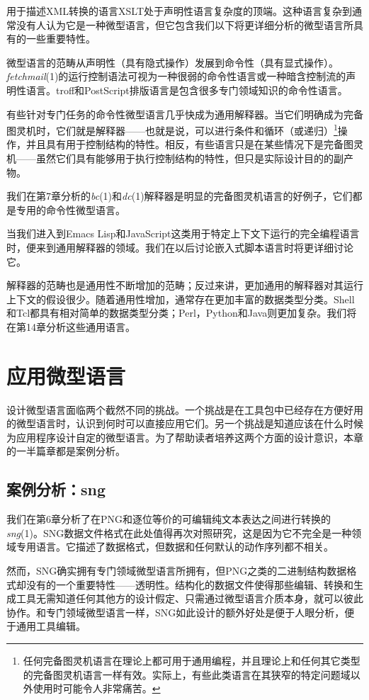 \documentclass[12pt,oneside]{book}
\begin{document}
用于描述XML转换的语言XSLT处于声明性语言复杂度的顶端。这种语言复杂到通常没有人认为它是一种微型语言，但它包含我们以下将更详细分析的微型语言所具有的一些重要特性。

微型语言的范畴从声明性（具有隐式操作）发展到命令性（具有显式操作）。\textit{fetchmail}(1)的运行控制语法可视为一种很弱的命令性语言或一种暗含控制流的声明性语言。troff和PostScript排版语言是包含很多专门领域知识的命令性语言。

有些针对专门任务的命令性微型语言几乎快成为通用解释器。当它们明确成为完备图灵机时，它们就是解释器——也就是说，可以进行条件和循环（或递归）\footnote{任何完备图灵机语言在理论上都可用于通用编程，并且理论上和任何其它类型的完备图灵机语言一样有效。实际上，有些此类语言在其狭窄的特定问题域以外使用时可能令人非常痛苦。}操作，并且具有用于控制结构的特性。相反，有些语言只是在某些情况下是完备图灵机——虽然它们具有能够用于执行控制结构的特性，但只是实际设计目的的副产物。

我们在第7章分析的\textit{bc}(1)和\textit{dc}(1)解释器是明显的完备图灵机语言的好例子，它们都是专用的命令性微型语言。

当我们进入到Emacs Lisp和JavaScript这类用于特定上下文下运行的完全编程语言时，便来到通用解释器的领域。我们在以后讨论嵌入式脚本语言时将更详细讨论它。

解释器的范畴也是通用性不断增加的范畴；反过来讲，更加通用的解释器对其运行上下文的假设很少。随着通用性增加，通常存在更加丰富的数据类型分类。Shell和Tcl都具有相对简单的数据类型分类；Perl，Python和Java则更加复杂。我们将在第14章分析这些通用语言。


\section{应用微型语言}
设计微型语言面临两个截然不同的挑战。一个挑战是在工具包中已经存在方便好用的微型语言时，认识到何时可以直接应用它们。另一个挑战是知道应该在什么时候为应用程序设计自定的微型语言。为了帮助读者培养这两个方面的设计意识，本章的一半篇章都是案例分析。

\subsection{案例分析：sng}
我们在第6章分析了在PNG和逐位等价的可编辑纯文本表达之间进行转换的\textit{sng}(1)。SNG数据文件格式在此处值得再次对照研究，这是因为它不完全是一种领域专用语言。它描述了数据格式，但数据和任何默认的动作序列都不相关。

然而，SNG确实拥有专门领域微型语言所拥有，但PNG之类的二进制结构数据格式却没有的一个重要特性——透明性。结构化的数据文件使得那些编辑、转换和生成工具无需知道任何其他方的设计假定、只需通过微型语言介质本身，就可以彼此协作。和专门领域微型语言一样，SNG如此设计的额外好处是便于人眼分析，便于通用工具编辑。
\end{document}
